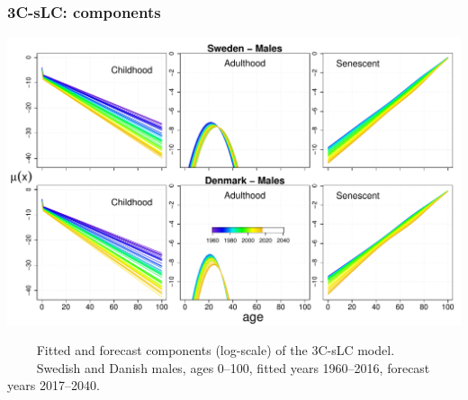 \documentclass[12pt, xcolor=table]{beamer}  %
\begin{document}
\begin{frame}           
	\frametitle{3C-sLC: components}
	
	\vspace{-0.35cm}
	
	\begin{center}
	\includegraphics[scale=.42]{Figures/Ch5/RATES_FIT_M}
	
	\end{center}

\vspace{-0.2cm}	
\tiny{$\quad\quad$ Fitted and forecast components (log-scale) of the 3C-sLC model. \\ $\quad\quad$ Swedish and Danish males, ages 0--100, fitted years 1960--2016, forecast years 2017--2040.}
	
\end{frame}
\end{document}
